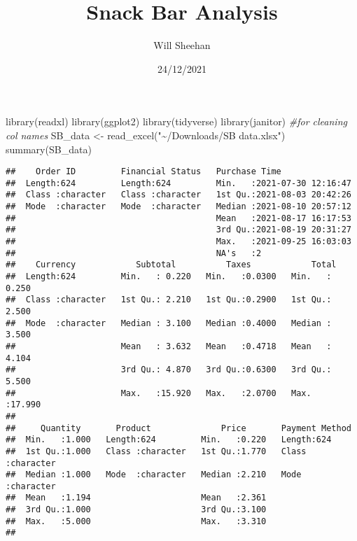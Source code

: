 \documentclass[
]{article}
\title{Snack Bar Analysis}
\author{Will Sheehan}
\date{24/12/2021}
\newenvironment{Shaded}{\begin{snugshade}}{\end{snugshade}}
\newcommand{\CommentTok}[1]{\textcolor[rgb]{0.56,0.35,0.01}{\textit{#1}}}
\newcommand{\FunctionTok}[1]{\textcolor[rgb]{0.00,0.00,0.00}{#1}}
\newcommand{\NormalTok}[1]{#1}
\newcommand{\OtherTok}[1]{\textcolor[rgb]{0.56,0.35,0.01}{#1}}
\newcommand{\StringTok}[1]{\textcolor[rgb]{0.31,0.60,0.02}{#1}}
\begin{document}
\maketitle

\begin{Shaded}
\begin{Highlighting}[]
\FunctionTok{library}\NormalTok{(readxl)}
\FunctionTok{library}\NormalTok{(ggplot2)}
\FunctionTok{library}\NormalTok{(tidyverse)}
\FunctionTok{library}\NormalTok{(janitor) }\CommentTok{\#for cleaning col names}
\NormalTok{SB\_data }\OtherTok{\textless{}{-}} \FunctionTok{read\_excel}\NormalTok{(}\StringTok{"\textasciitilde{}/Downloads/SB data.xlsx"}\NormalTok{)}
\FunctionTok{summary}\NormalTok{(SB\_data)}
\end{Highlighting}
\end{Shaded}

\begin{verbatim}
##    Order ID         Financial Status   Purchase Time                
##  Length:624         Length:624         Min.   :2021-07-30 12:16:47  
##  Class :character   Class :character   1st Qu.:2021-08-03 20:42:26  
##  Mode  :character   Mode  :character   Median :2021-08-10 20:57:12  
##                                        Mean   :2021-08-17 16:17:53  
##                                        3rd Qu.:2021-08-19 20:31:27  
##                                        Max.   :2021-09-25 16:03:03  
##                                        NA's   :2                    
##    Currency            Subtotal          Taxes            Total       
##  Length:624         Min.   : 0.220   Min.   :0.0300   Min.   : 0.250  
##  Class :character   1st Qu.: 2.210   1st Qu.:0.2900   1st Qu.: 2.500  
##  Mode  :character   Median : 3.100   Median :0.4000   Median : 3.500  
##                     Mean   : 3.632   Mean   :0.4718   Mean   : 4.104  
##                     3rd Qu.: 4.870   3rd Qu.:0.6300   3rd Qu.: 5.500  
##                     Max.   :15.920   Max.   :2.0700   Max.   :17.990  
##                                                                       
##     Quantity       Product              Price       Payment Method    
##  Min.   :1.000   Length:624         Min.   :0.220   Length:624        
##  1st Qu.:1.000   Class :character   1st Qu.:1.770   Class :character  
##  Median :1.000   Mode  :character   Median :2.210   Mode  :character  
##  Mean   :1.194                      Mean   :2.361                     
##  3rd Qu.:1.000                      3rd Qu.:3.100                     
##  Max.   :5.000                      Max.   :3.310                     
## 
\end{verbatim}
\end{document}
